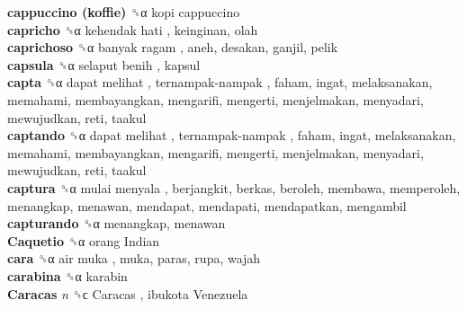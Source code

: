 \textbf{cappuccino (koffie)} ␝α   kopi cappuccino   \\
\textbf{capricho} ␝α   kehendak hati , keinginan, olah  \\
\textbf{caprichoso} ␝α   banyak ragam , aneh, desakan, ganjil, pelik  \\
\textbf{capsula} ␝α   selaput benih , kapsul  \\
\textbf{capta} ␝α   dapat melihat ,  ternampak-nampak , faham, ingat, melaksanakan, memahami, membayangkan, mengarifi, mengerti, menjelmakan, menyadari, mewujudkan, reti, taakul  \\
\textbf{captando} ␝α   dapat melihat ,  ternampak-nampak , faham, ingat, melaksanakan, memahami, membayangkan, mengarifi, mengerti, menjelmakan, menyadari, mewujudkan, reti, taakul  \\
\textbf{captura} ␝α   mulai menyala , berjangkit, berkas, beroleh, membawa, memperoleh, menangkap, menawan, mendapat, mendapati, mendapatkan, mengambil  \\
\textbf{capturando} ␝α  menangkap, menawan  \\
\textbf{Caquetio} ␝α   orang Indian   \\
\textbf{cara} ␝α   air muka , muka, paras, rupa, wajah  \\
\textbf{carabina} ␝α  karabin  \\
\textbf{Caracas} \emph{n}  ␝ϲ   Caracas ,  ibukota Venezuela   \\
